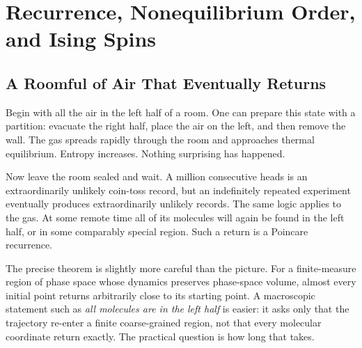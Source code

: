 \chapter{Recurrence, Nonequilibrium Order, and Ising Spins}


\section{A Roomful of Air That Eventually Returns}

Begin with all the air in the left half of a room.  One can prepare this state
with a partition: evacuate the right half, place the air on the left, and then
remove the wall.  The gas spreads rapidly through the room and approaches
thermal equilibrium.  Entropy increases.  Nothing surprising has happened.

Now leave the room sealed and wait.  A million consecutive heads is an
extraordinarily unlikely coin-toss record, but an indefinitely repeated
experiment eventually produces extraordinarily unlikely records.  The same
logic applies to the gas.  At some remote time all of its molecules will again
be found in the left half, or in some comparably special region.  Such a return
is a Poincare recurrence.

The precise theorem is slightly more careful than the picture.  For a
finite-measure region of phase space whose dynamics preserves phase-space
volume, almost every initial point returns arbitrarily close to its starting
point.  A macroscopic statement such as \emph{all molecules are in the left
half} is easier: it asks only that the trajectory re-enter a finite
coarse-grained region, not that every molecular coordinate return exactly.
The practical question is how long that takes.

